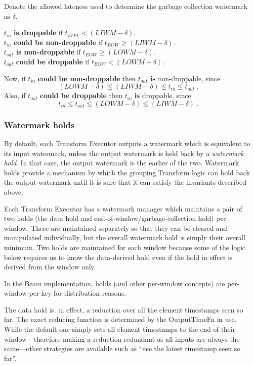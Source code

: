 Denote the allowed lateness used to determine the garbage collection watermark as $\delta$.

$t_{\mathit{in}}$ \textbf{is droppable} if $t_{\mathit{EOW}} < (\mathit{LIWM} - \delta)$.\\
$t_{\mathit{in}}$ \textbf{could be non-droppable} if $t_{\mathit{EOW}} \geq (\mathit{LIWM} - \delta)$.\\
$t_{\mathit{out}}$ \textbf{is non-droppable} if $t_{\mathit{EOW}} \geq (\mathit{LOWM} - \delta)$.\\
$t_{\mathit{out}}$ \textbf{could be droppable} if $t_{\mathit{EOW}} < (\mathit{LOWM} - \delta)$.

Now, if $t_{\mathit{in}}$ \textbf{could be non-droppable} then $t_{\mathit{out}}$ \textbf{is} non-droppable, since \[(\mathit{LOWM} - \delta) \leq (\mathit{LIWM} - \delta) \leq t_{\mathit{in}} \leq t_{\mathit{out}}\;\text{.}\]
Also, if $t_{\mathit{out}}$ \textbf{could be droppable} then $t_{\mathit{in}}$ \textbf{is} droppable, since \[t_{\mathit{in}} \leq t_{\mathit{out}} \leq (\mathit{LOWM} - \delta) \leq (\mathit{LIWM} - \delta)\;\text{.}\]

\subsubsection{Watermark holds}

By default, each Transform Executor outputs a watermark which is equivalent to its input watermark, unless the output watermark is held back by a \emph{watermark hold}.
In that case, the output watermark is the earlier of the two.
Watermark holds provide a mechanism by which the grouping Transform logic can hold back the output watermark until it is sure that it can satisfy the invariants described above.

Each Transform Executor has a watermark manager which maintains a pair of two holds (the data hold and end-of-window/garbage-collection hold) per window\footnotemark.
These are maintained separately so that they can be cleared and manipulated individually, but the overall watermark hold is simply their overall minimum.
Two holds are maintained for each window because some of the logic below requires us to know the data-derived hold even if the hold in effect is derived from the window only.

\footnotetext
{
In the Beam implementation, holds (and other per-window concepts) are per-window-per-key for distribution reasons.
}

The data hold is, in effect, a reduction over all the element timestamps seen so far.
The exact reducing function is determined by the OutputTimeFn in use.
While the default one simply sets all element timestamps to the end of their window---therefore making a reduction redundant as all inputs are always the same---other strategies are available such as ``use the latest timestamp seen so far''.

